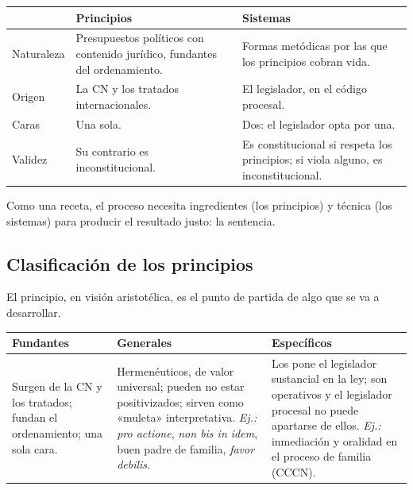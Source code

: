 \documentclass[12pt,oneside]{book}
\renewcommand{\arraystretch}{1.15}
\begin{document}
\begin{table}[H]
\centering
\renewcommand{\arraystretch}{1.2}
\begin{tabularx}{\textwidth}{>{\RaggedRight\arraybackslash}p{2.4cm}>{\RaggedRight\arraybackslash}X>{\RaggedRight\arraybackslash}X}
\toprule
 & \textbf{Principios} & \textbf{Sistemas} \\
\midrule
Naturaleza & Presupuestos políticos con contenido jurídico, fundantes del ordenamiento. & Formas metódicas por las que los principios cobran vida. \\
Origen & La CN y los tratados internacionales. & El legislador, en el código procesal. \\
Caras & Una sola. & Dos: el legislador opta por una. \\
Validez & Su contrario es inconstitucional. & Es constitucional si respeta los principios; si viola alguno, es inconstitucional. \\
\bottomrule
\end{tabularx}
\end{table}

Como una receta, el proceso necesita ingredientes (los principios) y técnica (los sistemas) para producir el resultado justo: la sentencia.

\subsection{Clasificación de los principios}

El principio, en visión aristotélica, es el punto de partida de algo que se va a desarrollar.

\begin{table}[H]
\centering
\renewcommand{\arraystretch}{1.2}
\small
\begin{tabularx}{\textwidth}{>{\RaggedRight\arraybackslash}X>{\RaggedRight\arraybackslash}X>{\RaggedRight\arraybackslash}X}
\toprule
\textbf{Fundantes} & \textbf{Generales} & \textbf{Específicos} \\
\midrule
Surgen de la CN y los tratados; fundan el ordenamiento; una sola cara. & Hermenéuticos, de valor universal; pueden no estar positivizados; sirven como «muleta» interpretativa. \textit{Ej.:} \textit{pro actione}, \textit{non bis in idem}, buen padre de familia, \textit{favor debilis}. & Los pone el legislador sustancial en la ley; son operativos y el legislador procesal no puede apartarse de ellos. \textit{Ej.:} inmediación y oralidad en el proceso de familia (CCCN). \\
\bottomrule
\end{tabularx}
\end{table}
\end{document}
